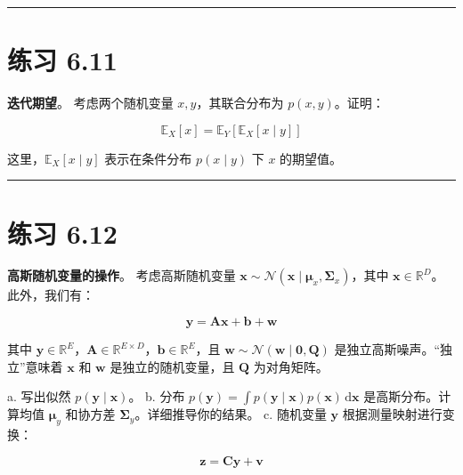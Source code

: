 \medskip\hrule\medskip

\section*{练习 6.11}

\textbf{迭代期望}。 考虑两个随机变量 $ x, y $，其联合分布为 $ p(x, y) $。证明：

\begin{equation*}
\mathbb{E}_X[x] = \mathbb{E}_Y \left[ \mathbb{E}_X[x \mid y] \right]
\end{equation*}

这里，$ \mathbb{E}_X[x \mid y] $ 表示在条件分布 $ p(x \mid y) $ 下 $ x $ 的期望值。

\medskip\hrule\medskip

\section*{练习 6.12}

\textbf{高斯随机变量的操作}。 考虑高斯随机变量 $ \boldsymbol{x} \sim \mathcal{N}(\boldsymbol{x} \mid \boldsymbol{\mu}_x, \boldsymbol{\Sigma}_x) $，其中 $ \boldsymbol{x} \in \mathbb{R}^D $。此外，我们有：

\begin{equation*}
\boldsymbol{y} = \boldsymbol{A} \boldsymbol{x} + \boldsymbol{b} + \boldsymbol{w}
\end{equation*}

其中 $ \boldsymbol{y} \in \mathbb{R}^E $，$ \boldsymbol{A} \in \mathbb{R}^{E \times D} $，$ \boldsymbol{b} \in \mathbb{R}^E $，且 $ \boldsymbol{w} \sim \mathcal{N}(\boldsymbol{w} \mid \boldsymbol{0}, \boldsymbol{Q}) $ 是独立高斯噪声。“独立”意味着 $ \boldsymbol{x} $ 和 $ \boldsymbol{w} $ 是独立的随机变量，且 $ \boldsymbol{Q} $ 为对角矩阵。

a. 写出似然 $ p(\boldsymbol{y} \mid \boldsymbol{x}) $。 b. 分布 $ p(\boldsymbol{y}) = \int p(\boldsymbol{y} \mid \boldsymbol{x}) p(\boldsymbol{x})\,\mathrm{d}\boldsymbol{x} $ 是高斯分布。计算均值 $ \boldsymbol{\mu}_y $ 和协方差 $ \boldsymbol{\Sigma}_y $。详细推导你的结果。 c. 随机变量 $ \boldsymbol{y} $ 根据测量映射进行变换：

\begin{equation*}
\boldsymbol{z} = \boldsymbol{C} \boldsymbol{y} + \boldsymbol{v}
\end{equation*}

